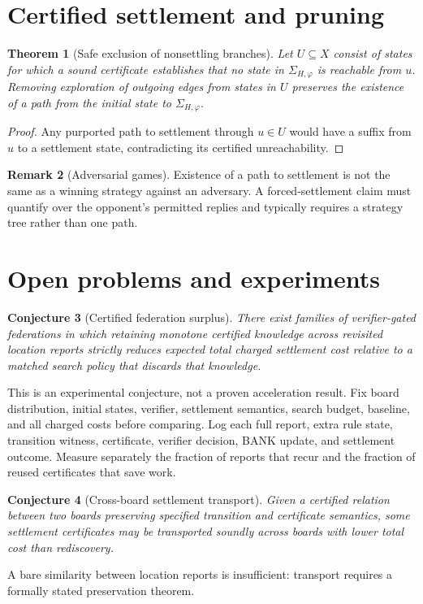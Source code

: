 \documentclass[11pt]{article}
\newtheorem{theorem}{Theorem}[section]
\newtheorem{conjecture}[theorem]{Conjecture}
\theoremstyle{definition}
\newtheorem{remark}[theorem]{Remark}
\begin{document}
\section{Certified settlement and pruning}
\begin{theorem}[Safe exclusion of nonsettling branches]
Let $U\subseteq X$ consist of states for which a sound certificate establishes that no state in $\Sigma_{H,\varphi}$ is reachable from $u$. Removing exploration of outgoing edges from states in $U$ preserves the existence of a path from the initial state to $\Sigma_{H,\varphi}$.
\end{theorem}
\begin{proof}
Any purported path to settlement through $u\in U$ would have a suffix from $u$ to a settlement state, contradicting its certified unreachability.
\end{proof}
\begin{remark}[Adversarial games]
Existence of a path to settlement is not the same as a winning strategy against an adversary. A forced-settlement claim must quantify over the opponent's permitted replies and typically requires a strategy tree rather than one path.
\end{remark}
\section{Open problems and experiments}
\begin{conjecture}[Certified federation surplus]
There exist families of verifier-gated federations in which retaining monotone certified knowledge across revisited location reports strictly reduces expected total charged settlement cost relative to a matched search policy that discards that knowledge.
\end{conjecture}
This is an experimental conjecture, not a proven acceleration result. Fix board distribution, initial states, verifier, settlement semantics, search budget, baseline, and all charged costs before comparing. Log each full report, extra rule state, transition witness, certificate, verifier decision, BANK update, and settlement outcome. Measure separately the fraction of reports that recur and the fraction of reused certificates that save work.
\begin{conjecture}[Cross-board settlement transport]
Given a certified relation between two boards preserving specified transition and certificate semantics, some settlement certificates may be transported soundly across boards with lower total cost than rediscovery.
\end{conjecture}
A bare similarity between location reports is insufficient: transport requires a formally stated preservation theorem.
\end{document}
